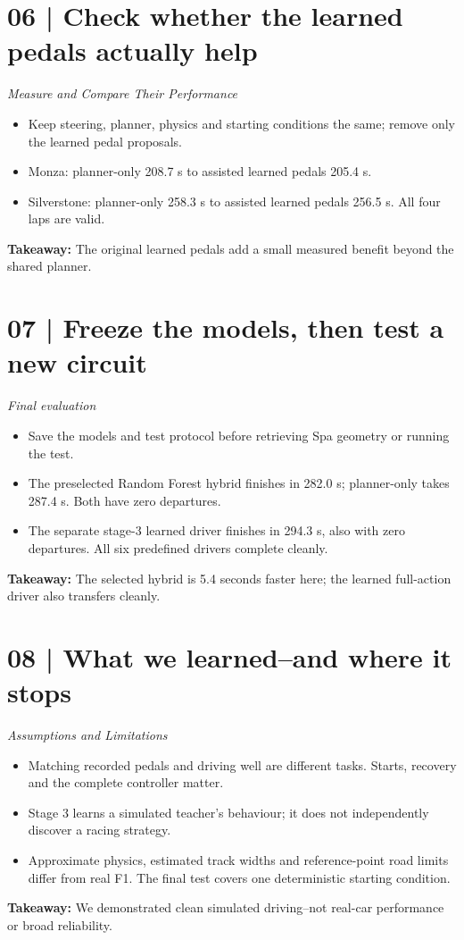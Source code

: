\documentclass[10pt,a4paper]{article}
\newcommand{\takeaway}[1]{\begin{tcolorbox}[colback=paperblue,colframe=paperblue,boxrule=0pt]#1\end{tcolorbox}}
\begin{document}
\section*{06 | Check whether the learned pedals actually help}
{\small\textit{Measure and Compare Their Performance}}
\begin{itemize}
\item Keep steering, planner, physics and starting conditions the same; remove only the learned pedal proposals.
\item Monza: planner-only 208.7 s to assisted learned pedals 205.4 s.
\item Silverstone: planner-only 258.3 s to assisted learned pedals 256.5 s. All four laps are valid.
\end{itemize}
\takeaway{\textbf{Takeaway:} The original learned pedals add a small measured benefit beyond the shared planner.}
\clearpage
\section*{07 | Freeze the models, then test a new circuit}
{\small\textit{Final evaluation}}
\begin{itemize}
\item Save the models and test protocol before retrieving Spa geometry or running the test.
\item The preselected Random Forest hybrid finishes in 282.0 s; planner-only takes 287.4 s. Both have zero departures.
\item The separate stage-3 learned driver finishes in 294.3 s, also with zero departures. All six predefined drivers complete cleanly.
\end{itemize}
\takeaway{\textbf{Takeaway:} The selected hybrid is 5.4 seconds faster here; the learned full-action driver also transfers cleanly.}
\section*{08 | What we learned--and where it stops}
{\small\textit{Assumptions and Limitations}}
\begin{itemize}
\item Matching recorded pedals and driving well are different tasks. Starts, recovery and the complete controller matter.
\item Stage 3 learns a simulated teacher's behaviour; it does not independently discover a racing strategy.
\item Approximate physics, estimated track widths and reference-point road limits differ from real F1. The final test covers one deterministic starting condition.
\end{itemize}
\takeaway{\textbf{Takeaway:} We demonstrated clean simulated driving--not real-car performance or broad reliability.}
\end{document}
